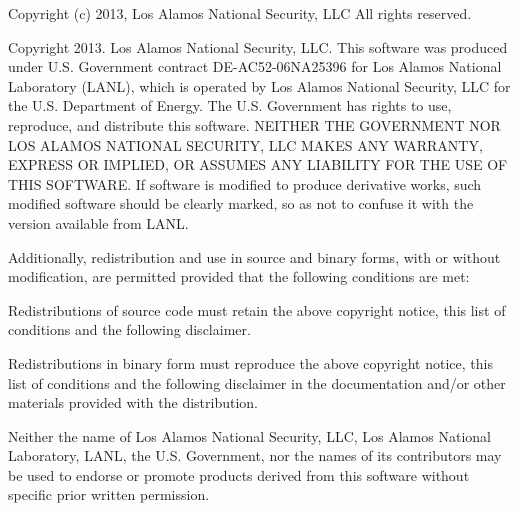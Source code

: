 Copyright (c) 2013, Los Alamos National Security, L\-L\-C All rights reserved.

Copyright 2013. Los Alamos National Security, L\-L\-C. This software was produced under U.\-S. Government contract D\-E-\/\-A\-C52-\/06\-N\-A25396 for Los Alamos National Laboratory (L\-A\-N\-L), which is operated by Los Alamos National Security, L\-L\-C for the U.\-S. Department of Energy. The U.\-S. Government has rights to use, reproduce, and distribute this software. N\-E\-I\-T\-H\-E\-R T\-H\-E G\-O\-V\-E\-R\-N\-M\-E\-N\-T N\-O\-R L\-O\-S A\-L\-A\-M\-O\-S N\-A\-T\-I\-O\-N\-A\-L S\-E\-C\-U\-R\-I\-T\-Y, L\-L\-C M\-A\-K\-E\-S A\-N\-Y W\-A\-R\-R\-A\-N\-T\-Y, E\-X\-P\-R\-E\-S\-S O\-R I\-M\-P\-L\-I\-E\-D, O\-R A\-S\-S\-U\-M\-E\-S A\-N\-Y L\-I\-A\-B\-I\-L\-I\-T\-Y F\-O\-R T\-H\-E U\-S\-E O\-F T\-H\-I\-S S\-O\-F\-T\-W\-A\-R\-E. If software is modified to produce derivative works, such modified software should be clearly marked, so as not to confuse it with the version available from L\-A\-N\-L.

Additionally, redistribution and use in source and binary forms, with or without modification, are permitted provided that the following conditions are met\-:


\begin{DoxyItemize}
\item Redistributions of source code must retain the above copyright notice, this list of conditions and the following disclaimer.
\item Redistributions in binary form must reproduce the above copyright notice, this list of conditions and the following disclaimer in the documentation and/or other materials provided with the distribution.
\item Neither the name of Los Alamos National Security, L\-L\-C, Los Alamos National Laboratory, L\-A\-N\-L, the U.\-S. Government, nor the names of its contributors may be used to endorse or promote products derived from this software without specific prior written permission.
\end{DoxyItemize}

